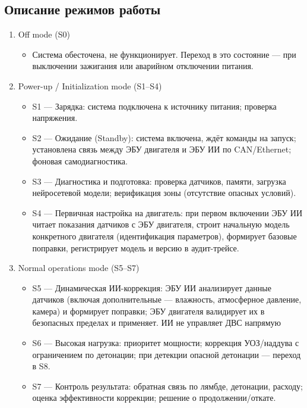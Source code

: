 \documentclass[14pt, a4paper]{extarticle}
\begin{document}
				\subsection{Описание режимов работы}
					\begin{enumerate}
						\item Off mode (S0)
							\begin{itemize}
								\item Система обесточена, не функционирует. Переход в это состояние — при выключении зажигания или аварийном отключении питания.
							\end{itemize}
							
						\item Power-up / Initialization mode (S1–S4)
							\begin{itemize}
								\item S1 — Зарядка: система подключена к источнику питания; проверка напряжения.
								\item S2 — Ожидание (Standby): система включена, ждёт команды на запуск; установлена связь между ЭБУ двигателя и ЭБУ ИИ по CAN/Ethernet; фоновая самодиагностика.
								\item S3 — Диагностика и подготовка: проверка датчиков, памяти, загрузка нейросетевой модели; верификация зоны (отсутствие опасных условий).
								\item S4 — Первичная настройка на двигатель: при первом включении ЭБУ ИИ читает показания датчиков с ЭБУ двигателя, строит начальную модель конкретного двигателя (идентификация параметров), формирует базовые поправки, регистрирует модель и версию в аудит-трейсе.
							\end{itemize}
						
						\item Normal operations mode (S5–S7)
							\begin{itemize}
								\item S5 — Динамическая ИИ-коррекция: ЭБУ ИИ анализирует данные датчиков (включая дополнительные — влажность, атмосферное давление, камера) и формирует поправки; ЭБУ двигателя валидирует их в безопасных пределах и применяет. ИИ не управляет ДВС напрямую
								\item S6 — Высокая нагрузка: приоритет мощности; коррекция УОЗ/наддува с ограничением по детонации; при детекции опасной детонации — переход в S8.
								\item S7 — Контроль результата: обратная связь по лямбде, детонации, расходу; оценка эффективности коррекции; решение о продолжении/откате.
							\end{itemize}
						

\end{enumerate}
\end{document}
